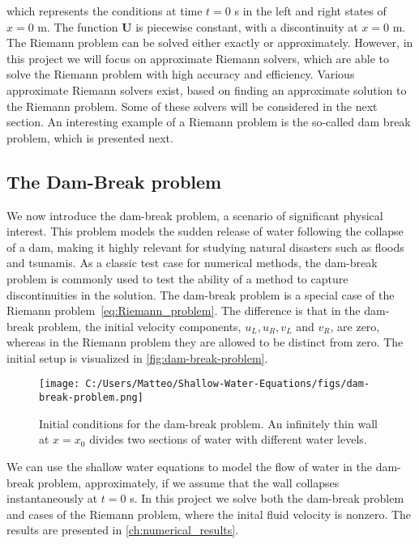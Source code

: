 which represents the conditions at time $t = 0$ s in the left and right states of $x = 0$ m.
The function $\mathbf{U}$ is piecewise constant, with a discontinuity at $x = 0$ m.
The Riemann problem can be solved either exactly or approximately.
However, in this project we will focus on approximate Riemann solvers, which are able to solve the Riemann problem with high accuracy and efficiency.
Various approximate Riemann solvers exist, based on finding an approximate solution to the Riemann problem.
Some of these solvers will be considered in the next section.
An interesting example of a Riemann problem is the so-called dam break problem, which is presented next.

\subsection{The Dam-Break problem}
We now introduce the dam-break problem, a scenario of significant physical interest.
This problem models the sudden release of water following the collapse of a dam, making it highly relevant for studying natural disasters such as floods and tsunamis.
As a classic test case for numerical methods, the dam-break problem is commonly used to test the ability of a method to capture discontinuities in the solution.
The dam-break problem is a special case of the Riemann problem~\eqref{eq:Riemann_problem}.
The difference is that in the dam-break problem, the initial velocity components, $u_L, u_R, v_L$ and $v_R$, are zero, whereas in the Riemann problem they are allowed to be distinct from zero.
The initial setup is visualized in \autoref{fig:dam-break-problem}.
\begin{figure}[H]
    \centering
    \texttt{[image: C:/Users/Matteo/Shallow-Water-Equations/figs/dam-break-problem.png]}
    \caption{Initial conditions for the dam-break problem. An infinitely thin wall at $x=x_0$ divides two sections of water with different water levels.}\label{fig:dam-break-problem}
\end{figure}
We can use the shallow water equations to model the flow of water in the dam-break problem, approximately, if we assume that the wall collapses instantaneously at $t=0$ s.
In this project we solve both the dam-break problem and cases of the Riemann problem, where the inital fluid velocity is nonzero.
The results are presented in \autoref{ch:numerical_results}.

